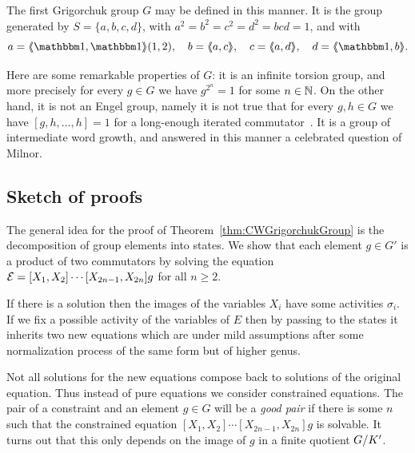 \documentclass[a4paper,11pt]{amsart}
\begin{document}
The first Grigorchuk group $G$ may be defined in this manner. It is
the group generated by $S=\{a,b,c,d\}$, with $a^2=b^2=c^2=d^2=bcd=1$,
and with
\[a=\pair{\id,\id}(1,2),\quad b=\pair{a,c},\quad c=\pair{a,d},\quad d=\pair{\id,b}. \]

Here are some remarkable properties of $G$: it is an infinite torsion
group, and more precisely for every $g\in G$ we have $g^{2^n}=1$ for
some $n\in\mathbb{N}$. On the other hand, it is not an Engel group, namely it
is not true that for every $g,h\in G$ we have $[g,h,\dots,h]=1$ for a
long-enough iterated commutator~\cite{Bartholdi:Engel}. It is a group
of intermediate word growth, and answered in this manner a celebrated
question of Milnor.


\subsection{Sketch of proofs}
The general idea for the proof of Theorem~\ref{thm:CWGrigorchukGroup} is
the decomposition of group elements into states. We show that each element
$g\in G'$ is a product of two commutators by solving the equation 
$\mathcal{E}=[X_1,X_2]\cdots[X_{2n-1},X_{2n}]g$ for all $n\geq 2$.

If there is a solution then the images of the variables $X_i$ have some 
activities $\sigma_i$. If we fix a possible activity
of the variables of $E$ then by passing to the states it inherits two new
equations which are under mild assumptions after some normalization process
of the same form but of higher genus. 

Not all solutions for the new equations compose back to solutions 
of the original equation. Thus instead of pure equations we consider
constrained equations. The pair of a constraint and an element $g\in G$ 
will be a \emph{good pair} if there is some $n$ such that the 
constrained equation $[X_1,X_2]\cdots[X_{2n-1},X_{2n}]g$ is solvable.
It turns out that this only depends on the image of $g$ in a finite
quotient ${G/K'}$. 
\end{document}
